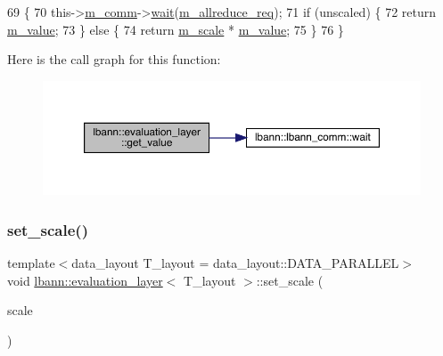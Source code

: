 \begin{DoxyCode}
69                                             \{
70     this->\hyperlink{classlbann_1_1Layer_a5de05c52f22e0bbd7c703bec3ad4dbf2}{m\_comm}->\hyperlink{classlbann_1_1lbann__comm_a30439f28cf615e1406090799c5499321}{wait}(\hyperlink{classlbann_1_1evaluation__layer_a3f2143da6cab67a7e1407a73116a2469}{m\_allreduce\_req});
71     \textcolor{keywordflow}{if} (unscaled) \{
72       \textcolor{keywordflow}{return} \hyperlink{classlbann_1_1evaluation__layer_a0d45f7694e2778f0a0dfb49212f37aef}{m\_value};
73     \} \textcolor{keywordflow}{else} \{
74       \textcolor{keywordflow}{return} \hyperlink{classlbann_1_1evaluation__layer_af365bda5700dca43434b01f0a2b1ee45}{m\_scale} * \hyperlink{classlbann_1_1evaluation__layer_a0d45f7694e2778f0a0dfb49212f37aef}{m\_value};
75     \}
76   \}
\end{DoxyCode}
Here is the call graph for this function\+:\nopagebreak
\begin{figure}[H]
\begin{center}
\leavevmode
\includegraphics[width=350pt]{classlbann_1_1evaluation__layer_a5300d3b7dd4719d2535f9b4838ae996f_cgraph}
\end{center}
\end{figure}
\mbox{\label{classlbann_1_1evaluation__layer_a47fe13276e74f749f6fceebc25c63bcf}} 
\subsubsection{\texorpdfstring{set\+\_\+scale()}{set\_scale()}}
{\footnotesize\ttfamily template$<$data\+\_\+layout T\+\_\+layout = data\+\_\+layout\+::\+D\+A\+T\+A\+\_\+\+P\+A\+R\+A\+L\+L\+EL$>$ \\
void \hyperlink{classlbann_1_1evaluation__layer}{lbann\+::evaluation\+\_\+layer}$<$ T\+\_\+layout $>$\+::set\+\_\+scale (\begin{DoxyParamCaption}\item[{\hyperlink{base_8hpp_a3266f5ac18504bbadea983c109566867}{Eval\+Type}}]{scale }\end{DoxyParamCaption})\hspace{0.3cm}{\ttfamily [inline]}}

